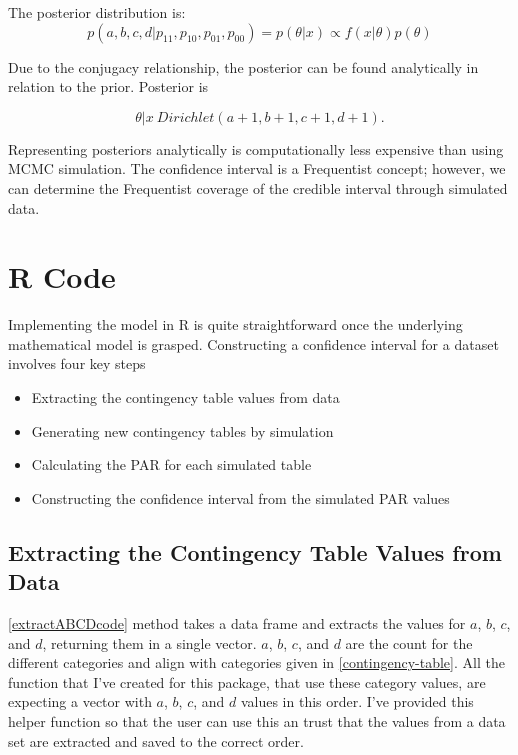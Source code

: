 The posterior distribution is:
\begin{equation}
    p(a,b,c,d|p_{11}, p_{10},p_{01},p_{00}) = p(\theta|x) \propto  f (x|\theta)p(\theta)
\end{equation}

Due to the conjugacy relationship, the posterior can be found analytically in relation to the prior. Posterior is

\begin{equation}
    \theta|x ~ Dirichlet(a + 1, b + 1, c + 1, d + 1).
\end{equation}

Representing posteriors analytically is computationally less expensive than using MCMC simulation. The confidence interval is a Frequentist concept; however, we can determine the Frequentist coverage of the credible interval through simulated data.

\section{R Code} \label{CodeImplementation}

Implementing the model in R is quite straightforward once the underlying mathematical model is grasped. Constructing a confidence interval for a dataset involves four key steps
\begin{itemize}
    \item Extracting the contingency table values from data
    \item Generating new contingency tables by simulation
    \item Calculating the PAR for each simulated table
    \item Constructing the confidence interval from the simulated PAR values
\end{itemize}

\subsection{Extracting the Contingency Table Values from Data}
\ref{extractABCDcode} method takes a data frame and extracts the values for $a$, $b$, $c$, and $d$, returning them in a single vector. $a$, $b$, $c$, and $d$ are the count for the different categories and align with categories given in \ref{contingency-table}. All the function that I've created for this package, that use these category values, are expecting a vector with $a$, $b$, $c$, and $d$ values in this order. I've provided this helper function so that the user can use this an trust that the values from a data set are extracted and saved to the correct order.


